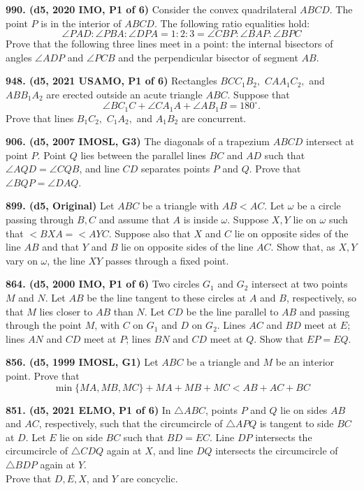 \documentclass{article}
\begin{document}
\textbf{990. (\color{red}d5\color{black}, 2020 IMO, P1 of 6)} Consider the convex quadrilateral $ABCD$. The point $P$ is in the interior of $ABCD$. The following ratio equalities hold:
\[\angle PAD:\angle PBA:\angle DPA=1:2:3=\angle CBP:\angle BAP:\angle BPC\]Prove that the following three lines meet in a point: the internal bisectors of angles $\angle ADP$ and $\angle PCB$ and the perpendicular bisector of segment $AB$.

\textbf{948. (\color{red}d5\color{black}, 2021 USAMO, P1 of 6)} Rectangles $BCC_1B_2,$ $CAA_1C_2,$ and $ABB_1A_2$ are erected outside an acute triangle $ABC.$ Suppose that \[\angle BC_1C+\angle CA_1A+\angle AB_1B=180^{\circ}.\]Prove that lines $B_1C_2,$ $C_1A_2,$ and $A_1B_2$ are concurrent.

\textbf{906. (\color{red}d5\color{black}, 2007 IMOSL, G3)} The diagonals of a trapezium $ ABCD$ intersect at point $ P$. Point $ Q$ lies between the parallel lines $ BC$ and $ AD$ such that $ \angle AQD = \angle CQB$, and line $ CD$ separates points $ P$ and $ Q$. Prove that $ \angle BQP = \angle DAQ$.

\textbf{899. (\color{red}d5\color{black}, Original)} Let $ABC$ be a triangle with $AB<AC$. Let $\omega$ be a circle passing through $B, C$ and
assume that $A$ is inside $\omega$. Suppose $X, Y$ lie on $\omega$ such that $<BXA=<AYC$. Suppose also that $X$ and $C$ lie on opposite sides of the line $AB$ and that $Y$ and $B$ lie on opposite sides of the line $AC$. Show that, as $X, Y$ vary on $\omega$, the line $XY$ passes through a fixed point.

\textbf{864. (\color{red}d5\color{black}, 2000 IMO, P1 of 6)} Two circles $ G_1$ and $ G_2$ intersect at two points $ M$ and $ N$. Let $ AB$ be the line tangent to these circles at $ A$ and $ B$, respectively, so that $ M$ lies closer to $ AB$ than $ N$. Let $ CD$ be the line parallel to $ AB$ and passing through the point $ M$, with $ C$ on $ G_1$ and $ D$ on $ G_2$. Lines $ AC$ and $ BD$ meet at $ E$; lines $ AN$ and $ CD$ meet at $ P$; lines $ BN$ and $ CD$ meet at $ Q$. Show that $ EP = EQ$.

\textbf{856. (\color{red}d5\color{black}, 1999 IMOSL, G1)} Let $A B C$ be a triangle and $M$ be an interior point. Prove that
$$
    \min \{M A, M B, M C\}+M A+M B+M C<A B+A C+B C
$$

\textbf{851. (\color{red}d5\color{black}, 2021 ELMO, P1 of 6)} In $\triangle A B C$, points $P$ and $Q$ lie on sides $A B$ and $A C$, respectively, such that the circumcircle of $\triangle A P Q$ is tangent to side $B C$ at $D$. Let $E$ lie on side $B C$ such that $B D=E C .$ Line $D P$ intersects the circumcircle of $\triangle C D Q$ again at $X$, and line $D Q$ intersects the circumcircle of $\triangle B D P$ again at $Y$. \\
Prove that $D, E, X$, and $Y$ are concyclic.
\end{document}
